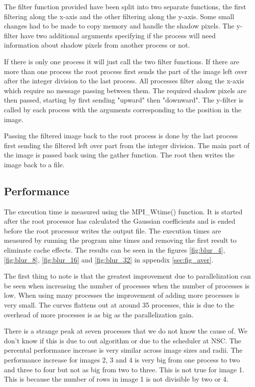 \documentclass[a4paper, 12pt]{article}
\begin{document}
The filter function provided have been split into two separate functions, the
first filtering along the x-axis and the other filtering along the y-axis. Some
small changes had to be made to copy memory and handle the shadow pixels. The
y-filter have two additional arguments specifying if the process will need
information about shadow pixels from another process or not. 

If there is only one process it will just call the two filter functions. If
there are more than one process the root process first sends the part of the
image left over after the integer division to the last process. All processes
filter along the x-axis which require no message passing between them.
The required shadow pixels are then passed, starting by first sending "upward"
then "downward". The y-filter is called by each process with the arguments 
corresponding to the position in the image. 

Passing the filtered image back to the root process is done by the last process 
first sending the filtered left over part from the integer division. The main
part of the image is passed back using the gather function.
The root then writes the image back to a file.
 

\subsection{Performance}
The execution time is measured using the MPI\_Wtime() function. It is started
after the root processor has calculated the Gaussian
coefficients and is ended before the root processor writes the output file.
The execution times are measured by running the program nine times and removing the
first result to eliminate cache effects. The results can be seen in the figures
\ref{fig:blur_4}, \ref{fig:blur_8}, \ref{fig:blur_16} and \ref{fig:blur_32} in
appendix \ref{sec:fig_aver}.

The first thing to note is that the greatest improvement due to parallelization
can be seen when increasing the number of processes when the number of processes
is low. When using many processes the improvement of adding more processes is
very small. The curves flattens out at around 35 processes, this is due to the
overhead of more processes is as big as the parallelization gain.

There is a strange peak at seven processes that we do not know the cause of. We don't
know if this is due to out algorithm or due to the scheduler at NSC.
The percental performance increase is very similar across image sizes and radii.
The performance increase for images 2, 3 and 4 is very big from one process to
two and three to four but not as big from two to three. This is not true for image 1. This is
because the number of rows in image 1 is not divisible by two or 4.
\end{document}
